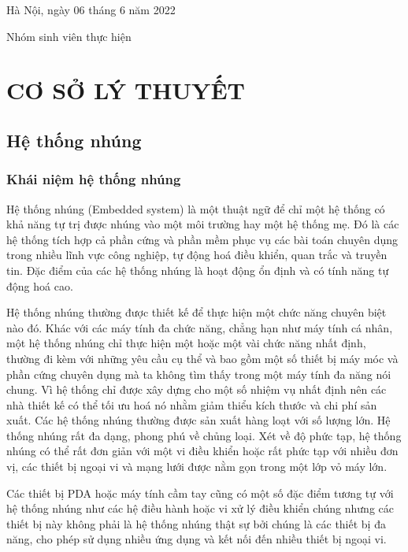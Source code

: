 \documentclass{report}
\begin{document}
\vspace{0.5cm}

\hspace{6cm}Hà Nội, ngày 06 tháng 6 năm 2022

\vspace{2cm}

\hspace{7cm}Nhóm sinh viên thực hiện

\newpage


\chapter{CƠ SỞ LÝ THUYẾT}
\section{Hệ thống nhúng}
\subsection{Khái niệm hệ thống nhúng}

Hệ thống nhúng (Embedded system) là một thuật ngữ để chỉ một hệ thống có khả năng tự trị được nhúng vào một môi trường hay một hệ thống mẹ. Đó là các hệ thống tích hợp cả phần cứng và phần mềm phục vụ các bài toán chuyên dụng trong nhiều lĩnh vực công nghiệp, tự động hoá điều khiển, quan trắc và truyền tin. Đặc điểm của các hệ thống nhúng là hoạt động ổn định và có tính năng tự động hoá cao. \cite{giao-trinh}

Hệ thống nhúng thường được thiết kế để thực hiện một chức năng chuyên biệt nào đó. Khác với các máy tính đa chức năng, chẳng hạn như máy tính cá nhân, một hệ thống nhúng chỉ thực hiện một hoặc một vài chức năng nhất định, thường đi kèm với những yêu cầu cụ thể và bao gồm một số thiết bị máy móc và phần cứng chuyên dụng mà ta không tìm thấy trong một máy tính đa năng nói chung. Vì hệ thống chỉ được xây dựng cho một số nhiệm vụ nhất định nên các nhà thiết kế có thể tối ưu hoá nó nhằm giảm thiểu kích thước và chi phí sản xuất. Các hệ thống nhúng thường được sản xuất hàng loạt với số lượng lớn. Hệ thống nhúng rất đa dạng, phong phú về chủng loại. Xét về độ phức tạp, hệ thống nhúng có thể rất đơn giản với một vi điều khiển hoặc rất phức tạp với nhiều đơn vị, các thiết bị ngoại vi và mạng lưới được nằm gọn trong một lớp vỏ máy lớn.

Các thiết bị PDA hoặc máy tính cầm tay cũng có một số đặc điểm tương tự với hệ thống nhúng như các hệ điều hành hoặc vi xử lý điều khiển chúng nhưng các thiết bị này không phải là hệ thống nhúng thật sự bởi chúng là các thiết bị đa năng, cho phép sử dụng nhiều ứng dụng và kết nối đến nhiều thiết bị ngoại vi.
\end{document}
